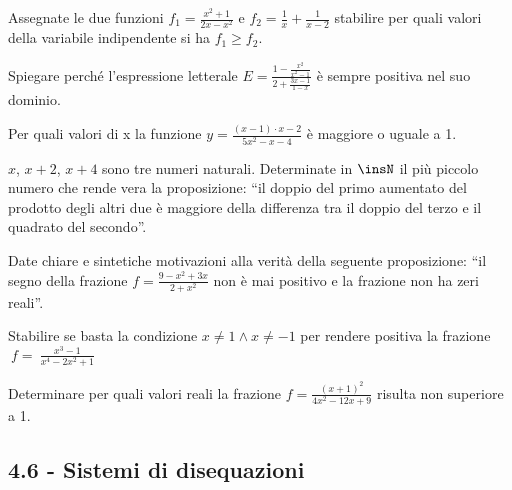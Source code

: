\begin{esercizio}[\Ast]
 \label{ese:4.64}
Assegnate le due funzioni $f_1=\frac{x^2+1}{2x-x^2}$ e $f_2=\frac 1 x+\frac 1{x-2}$ stabilire per quali valori della variabile indipendente si ha $f_1\ge f_2$.
\end{esercizio}

\begin{esercizio}
 \label{ese:4.65}
Spiegare perché l'espressione letterale $E=\frac{1-\frac{x^2}{x^2-1}}{2+\frac{3x-1}{1-x}}$ è sempre positiva nel suo dominio.
\end{esercizio}

\begin{esercizio}[\Ast]
 \label{ese:4.66}
Per quali valori di x la funzione $y=\frac{(x-1)\cdot x-2}{5x^2-x-4}$ è maggiore o uguale a 1.
\end{esercizio}

\begin{esercizio}[\Ast]
 \label{ese:4.67}
$ x $, $ x+2 $, $ x+4 $ sono tre numeri naturali. Determinate in $ \insN $ il più piccolo numero che rende vera la proposizione: ``il doppio del primo aumentato del prodotto degli altri due è maggiore della differenza tra il doppio del terzo e il quadrato del secondo''.
\end{esercizio}

\begin{esercizio}
 \label{ese:4.68}
Date chiare e sintetiche motivazioni alla verità della seguente proposizione: “il segno della frazione $f=\frac{9-x^2+3x}{2+x^2}$ non è mai positivo e la frazione non ha zeri reali”.
\end{esercizio}

\begin{esercizio}
 \label{ese:4.69}
Stabilire se basta la condizione $x\neq 1\wedge x\neq -1$ per rendere positiva la frazione $~f=~\frac{x^3-1}{x^4-2x^2+1}$
\end{esercizio}

\begin{esercizio}
 \label{ese:4.70}
Determinare per quali valori reali la frazione $f=\frac{(x+1)^2}{4x^2-12x+9}$ risulta non superiore a 1.
\end{esercizio}

\subsection*{4.6 - Sistemi di disequazioni}

